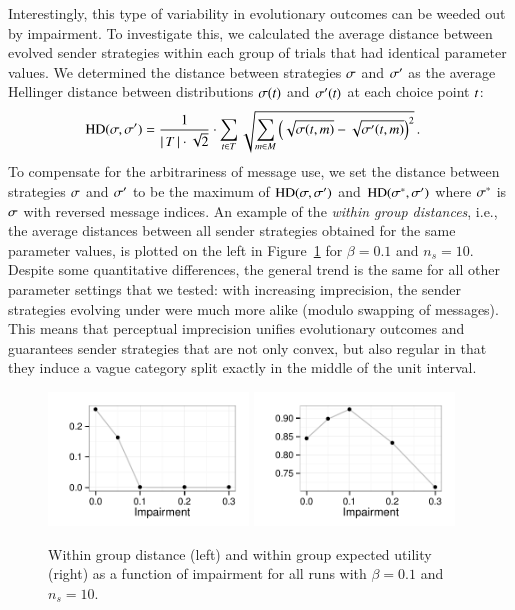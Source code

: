 \documentclass[fleqn,reqno,10pt]{article}
\newcommand{\rdd}{\acro{rdd}} %
\newcommand{\toler}{\ensuremath{\beta}} %
\begin{document}
Interestingly, this type of variability in evolutionary outcomes can
be weeded out by impairment. To investigate this, we calculated the average
distance between evolved sender strategies within each group of trials
that had identical parameter values. We determined the distance
between strategies $\sigma$ and $\sigma'$ as the average Hellinger
distance between distributions $\sigma(t)$ and
$\sigma'(t)$ at each choice point $t$:
\begin{align*}
  \text{HD}(\sigma,\sigma') & = \frac{1}{{\left \lvert \, T \, \right\rvert \cdot
     \sqrt{2}}} \cdot  \sum_{t \in T} 
 \sqrt{\sum_{m \in  M}
         \left ( \sqrt{\sigma(t,m)} -
         \sqrt{\sigma'(t,m)} \right )^2 }\,.
\end{align*}
To compensate for the arbitrariness of message use, we set the
distance between strategies $\sigma$ and $\sigma'$ to be the maximum
of $\text{HD}(\sigma,\sigma')$ and $\text{HD}(\sigma^*,\sigma')$
where $\sigma^*$ is $\sigma$ with reversed message indices. An example of the
\emph{within group distances}, i.e., the average distances between all
sender strategies obtained for the same parameter values, is plotted
on the left in Figure~\ref{fig:GroupMeasures} for $\beta =
0.1$ and $n_s = 10$. Despite some quantitative differences, the
general trend is the same for all other parameter settings that we tested:
with increasing imprecision, the sender strategies evolving under \rdd
were much more alike (modulo swapping of messages). This means that
perceptual imprecision unifies evolutionary outcomes and guarantees
sender strategies that are not only convex, but also regular in that
they induce a vague category split exactly in the middle of the unit
interval.

\begin{figure}
  \centering

    \includegraphics[width=0.475\textwidth]{plots/WithinGroupDistanceConcise.pdf}
    \hfill
    \includegraphics[width=0.475\textwidth]{plots/WithinGroupEUConcise.pdf}

    \caption{Within group distance (left) and within group expected
      utility (right) as a function of impairment for all runs with
      $\toler = 0.1$ and $n_s = 10$.}
  \label{fig:GroupMeasures}
\end{figure}
\end{document}
